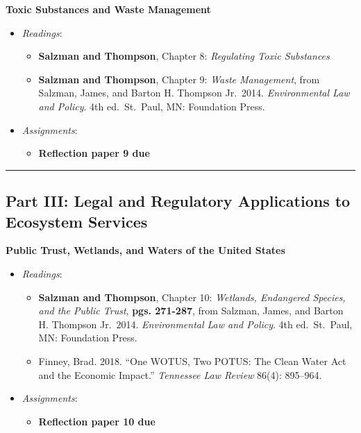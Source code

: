 \week \textbf{Toxic Substances and Waste Management}

\begin{itemize}

\item
  \emph{Readings}:

  \begin{itemize}
  
  \item
    \textbf{Salzman and Thompson}, Chapter 8: \emph{Regulating Toxic
    Substances}
  \item
    \textbf{Salzman and Thompson}, Chapter 9: \emph{Waste Management},
    from Salzman, James, and Barton H. Thompson Jr.~2014.
    \emph{Environmental Law and Policy}. 4th ed.~St.~Paul, MN:
    Foundation Press.
  \end{itemize}
\item
  \emph{Assignments}:

  \begin{itemize}
  
  \item
    \textbf{‌Reflection paper 9 due}
  \end{itemize}
\end{itemize}

\begin{center}\rule{0.5\linewidth}{0.5pt}\end{center}

\hypertarget{part-iii-legal-and-regulatory-applications-to-ecosystem-services}{%
\subsection{Part III: Legal and Regulatory Applications to Ecosystem
Services}\label{part-iii-legal-and-regulatory-applications-to-ecosystem-services}}

\week \textbf{Public Trust, Wetlands, and Waters of the United States}

\begin{itemize}

\item
  \emph{Readings}:

  \begin{itemize}
  
  \item
    \textbf{Salzman and Thompson}, Chapter 10: \emph{Wetlands,
    Endangered Species, and the Public Trust}, \textbf{pgs. 271-287},
    from Salzman, James, and Barton H. Thompson Jr.~2014.
    \emph{Environmental Law and Policy}. 4th ed.~St.~Paul, MN:
    Foundation Press.
  \item
    Finney, Brad. 2018. ``One WOTUS, Two POTUS: The Clean Water Act and
    the Economic Impact.'' \emph{Tennessee Law Review} 86(4): 895--964.
  \end{itemize}
\item
  \emph{Assignments}:

  \begin{itemize}
  
  \item
    \textbf{‌Reflection paper 10 due}
  \end{itemize}
\end{itemize}

